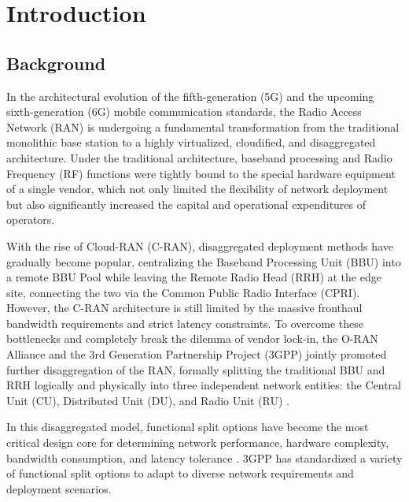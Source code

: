\documentclass[../my_ntust_thesis.tex]{subfiles}
\begin{document}

\chapter{Introduction}
\label{sec:intro}

\section{Background}
\label{sec:background}

In the architectural evolution of the fifth-generation (5G) and the upcoming sixth-generation (6G) mobile communication standards, the Radio Access Network (RAN) is undergoing a fundamental transformation from the traditional monolithic base station to a highly virtualized, cloudified, and disaggregated architecture. Under the traditional architecture, baseband processing and Radio Frequency (RF) functions were tightly bound to the special hardware equipment of a single vendor, which not only limited the flexibility of network deployment but also significantly increased the capital and operational expenditures of operators.

With the rise of Cloud-RAN (C-RAN), disaggregated deployment methods have gradually become popular, centralizing the Baseband Processing Unit (BBU) into a remote BBU Pool while leaving the Remote Radio Head (RRH) at the edge site, connecting the two via the Common Public Radio Interface (CPRI). However, the C-RAN architecture is still limited by the massive fronthaul bandwidth requirements and strict latency constraints. To overcome these bottlenecks and completely break the dilemma of vendor lock-in, the O-RAN Alliance \cite{O-RAN.spec} and the 3rd Generation Partnership Project (3GPP) jointly promoted further disaggregation of the RAN, formally splitting the traditional BBU and RRH logically and physically into three independent network entities: the Central Unit (CU), Distributed Unit (DU), and Radio Unit (RU) \cite{3gpp_tr_38_801, agarwal2025open}.

In this disaggregated model, functional split options have become the most critical design core for determining network performance, hardware complexity, bandwidth consumption, and latency tolerance \cite{larsen2019comparison, PerezRomero2023}. 3GPP has standardized a variety of functional split options to adapt to diverse network requirements and deployment scenarios.
\end{document}
